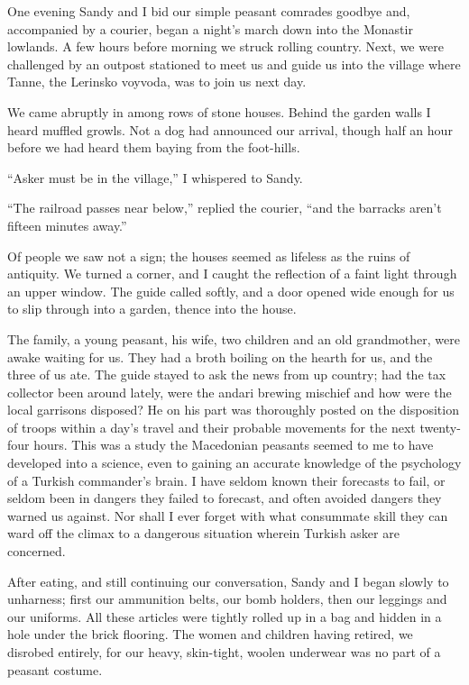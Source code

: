 \documentclass[a5paper,12pt]{book}
\begin{document}
One evening Sandy and I bid our simple peasant comrades goodbye and, accompanied by a courier, began a night’s march down into the Monastir lowlands. A few hours before morning we struck rolling country. Next, we were challenged by an outpost stationed to meet us and guide us into the village where Tanne, the Lerinsko voyvoda, was to join us next day.

We came abruptly in among rows of stone houses. Behind the garden walls I heard muffled growls. Not a dog had announced our arrival, though half an hour before we had heard them baying from the foot-hills.

“Asker must be in the village,” I whispered to Sandy.

“The railroad passes near below,” replied the courier, “and the barracks aren’t fifteen minutes away.”

Of people we saw not a sign; the houses seemed as lifeless as the ruins of antiquity. We turned a corner, and I caught the reflection of a faint light through an upper window. The guide called softly, and a door opened wide enough for us to slip through into a garden, thence into the house.

The family, a young peasant, his wife, two children and an old grandmother, were awake waiting for us. They had a broth boiling on the hearth for us, and the three of us ate. The guide stayed to ask the news from up country; had the tax collector been around lately, were the andari brewing mischief and how were the local garrisons disposed? He on his part was thoroughly posted on the disposition of troops within a day’s travel and their probable movements for the next twenty-four hours. This was a study the Macedonian peasants seemed to me to have developed into a science, even to gaining an accurate knowledge of the psychology of a Turkish commander’s brain. I have seldom known their forecasts to fail, or seldom been in dangers they failed to forecast, and often avoided dangers they warned us against. Nor shall I ever forget with what consummate skill they can ward off the climax to a dangerous situation wherein Turkish asker are concerned.

After eating, and still continuing our conversation, Sandy and I began slowly to unharness; first our ammunition belts, our bomb holders, then our leggings and our uniforms. All these articles were tightly rolled up in a bag and hidden in a hole under the brick flooring. The women and children having retired, we disrobed entirely, for our heavy, skin-tight, woolen underwear was no part of a peasant costume.
\end{document}

